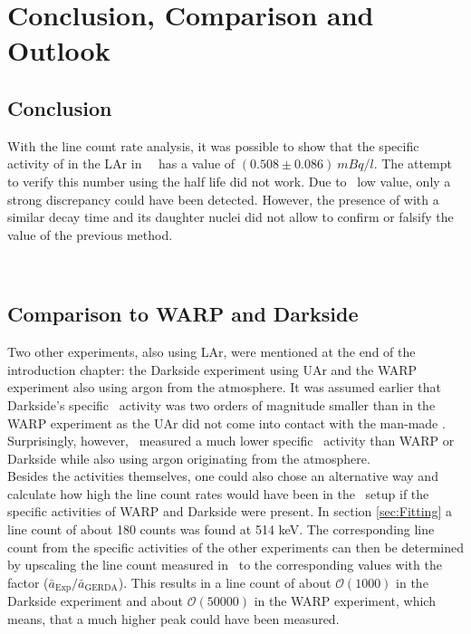 \documentclass[encoding=utf8,british]{tumphthesis}
\begin{document}


\chapter{Conclusion, Comparison and Outlook}
\label{sec:ConcAndOutlook}
\section{Conclusion}

With the line count rate analysis, it was possible to show that the specific activity of  in the LAr in \gerda\ \PII\ has a value of $(0.508\pm0.086) \ \unit{mBq} / \unit{l}$.
The attempt to verify this number using the half life did not work.
Due to \Kr\ low value, only a strong discrepancy could have been detected.
However, the presence of  with a similar decay time and its daughter nuclei  did not allow to confirm or falsify the value of the previous method.

\\
\section{Comparison to WARP and Darkside}

Two other experiments, also using LAr, were mentioned at the end of the introduction chapter: the Darkside experiment using UAr and the WARP experiment also using argon from the atmosphere.
It was assumed earlier that Darkside's specific \Kr\ activity was two orders of magnitude smaller than in the WARP experiment as the UAr did not come into contact with the man-made \Kr.
Surprisingly, however, \gerda\ measured a much lower specific \Kr\ activity than WARP or Darkside while also using argon originating from the atmosphere.
\\

Besides the activities themselves, one could also chose an alternative way and calculate how high the line count rates would have been in the \gerda\ setup if the specific activities of WARP and Darkside were present.
In section \ref{sec:Fitting} a line count of about 180 counts was found at 514 keV.
The corresponding line count from the specific activities of the other experiments can then be determined by upscaling the line count measured in \gerda\ to the corresponding values with the factor ($\bar{a}_{\mathrm{Exp}}/\bar{a}_{\mathrm{GERDA}}$).
This results in a line count of about $\mathcal{O}(1000)$ in the Darkside experiment and about $\mathcal{O}(50000)$ in the WARP experiment, which means, that a much higher peak could have been measured.
\\
\end{document}
